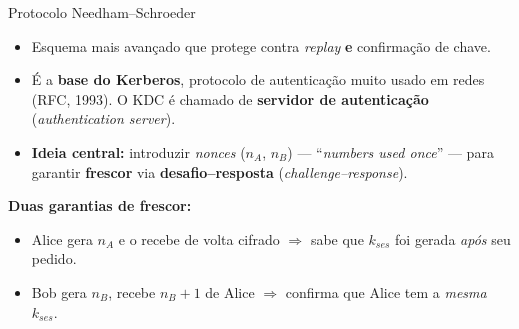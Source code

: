 \documentclass{beamer}
\begin{document}
\begin{frame}{Protocolo Needham--Schroeder}
    \begin{itemize}
        \item Esquema mais avançado que protege contra \textit{replay} \textbf{e} confirmação de chave.
        \item É a \textbf{base do Kerberos}, protocolo de autenticação muito usado em redes (RFC, 1993). O KDC é chamado de \textbf{servidor de autenticação} (\textit{authentication server}).
        \item \textbf{Ideia central:} introduzir \textit{nonces} ($n_A$, $n_B$) --- ``\textit{numbers used once}'' --- para garantir \textbf{frescor} via \textbf{desafio--resposta} (\textit{challenge--response}).
    \end{itemize}
    \medskip
    \begin{tcolorbox}[colback=blue!5,colframe=blue!50!black,boxrule=0.5pt]
        \footnotesize
        \textbf{Duas garantias de frescor:}
        \begin{itemize}
            \item Alice gera $n_A$ e o recebe de volta cifrado $\Rightarrow$ sabe que $k_{ses}$ foi gerada \emph{após} seu pedido.
            \item Bob gera $n_B$, recebe $n_B + 1$ de Alice $\Rightarrow$ confirma que Alice tem a \emph{mesma} $k_{ses}$.
        \end{itemize}
    \end{tcolorbox}
\end{frame}
\end{document}
